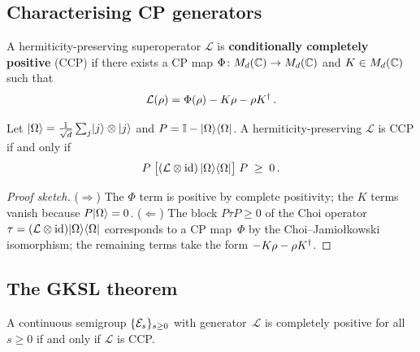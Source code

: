 \subsection{Characterising CP generators}\label{sec:cp-generators}

\begin{definition}%
\label{def:ccp}
  A hermiticity-preserving superoperator $\mathcal{L}$ is
  \textbf{conditionally completely positive} (CCP) if there exists
  a CP map $\Phi\colon M_{d}(\mathbb{C}) \to M_{d}(\mathbb{C})$ and $K \in M_{d}(\mathbb{C})$
  such that
  \begin{equation}\label{eq:ccp-form}
    \mathcal{L}(\rho) = \Phi(\rho) - K\rho - \rho K^\dagger\,.
  \end{equation}
\end{definition}

\begin{proposition}%
\label{prop:ccp-equiv}
  Let $\lvert \Omega \rangle = \frac{1}{\sqrt{d}}\sum_j \lvert j \rangle\otimes\lvert j \rangle$
  and $P = \mathbb{I} - \lvert \Omega \rangle\langle \Omega \rvert$.  A
  hermiticity-preserving $\mathcal{L}$ is CCP if and only if
  \begin{equation}\label{eq:ccp-condition}
    P\;\bigl[(\mathcal{L}\otimes\operatorname{id})\,
      \lvert \Omega \rangle\langle \Omega \rvert\bigr]\;P
    \;\geq\; 0\,.
  \end{equation}
\end{proposition}

\begin{proof}[Proof sketch]
  ($\Rightarrow$) The $\Phi$ term is positive by complete
  positivity; the $K$ terms vanish because $P\lvert \Omega \rangle = 0$.
  ($\Leftarrow$) The block $P\tau P \geq 0$ of the Choi operator
  $\tau = (\mathcal{L}\otimes\operatorname{id})\lvert \Omega \rangle\langle \Omega \rvert$ corresponds
  to a CP map~$\Phi$ by the Choi--Jamio\l{}kowski isomorphism; the
  remaining terms take the form $-K\rho - \rho K^\dagger$.
\end{proof}

\subsection{The GKSL theorem}\label{sec:gksl-theorem}

\begin{proposition}%
\label{prop:cp-semigroup-ccp}
  A continuous semigroup $\{\mathcal{E}_s\}_{s\geq 0}$ with
  generator~$\mathcal{L}$ is completely positive for all $s\geq 0$
  if and only if $\mathcal{L}$ is CCP.
\end{proposition}

